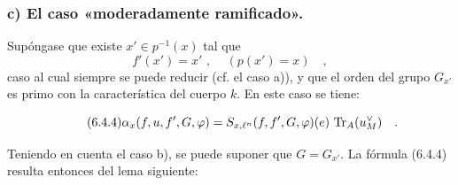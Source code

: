 \subsubsection*{c) El caso «moderadamente ramificado».} Supóngase que existe $x' \in p^{-1}(x)$ tal que
\[
f'(x') = x' \text{ , } \quad (p(x') = x) \quad ,
\]
caso al cual siempre se puede reducir (cf. el caso a)), y que el orden del grupo $G_{x'}$ es primo con la característica del cuerpo $k$. En este caso se tiene:

\begin{equation}\tag{6.4.4}
\alpha_x(f,u, f', G, \varphi) = S_{x,\ell^n}(f, f', G, \varphi)(e) \, \operatorname{Tr}_A(u_M^\vee) \quad .
\end{equation}

Teniendo en cuenta el caso b), se puede suponer que $G = G_{x'}$. La fórmula (6.4.4) resulta entonces del lema siguiente:
